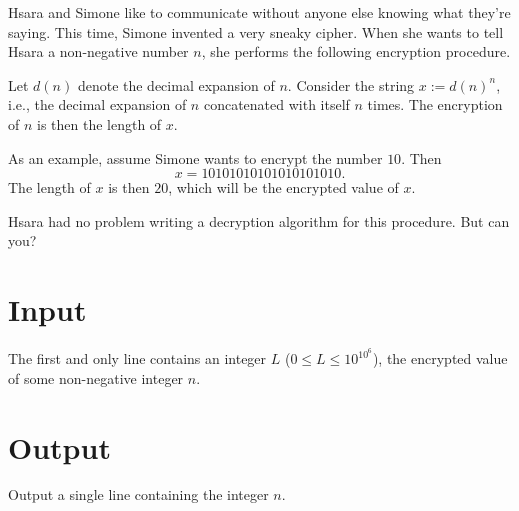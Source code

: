 
Hsara and Simone like to communicate without anyone else knowing what they're saying.
This time, Simone invented a very sneaky cipher.
When she wants to tell Hsara a non-negative number $n$, she performs the following encryption procedure.

Let $d(n)$ denote the decimal expansion of $n$.
Consider the string $x := d(n)^n$, i.e., the decimal expansion of $n$ concatenated with itself $n$ times.
The encryption of $n$ is then the length of $x$.

As an example, assume Simone wants to encrypt the number $10$.
Then
\[
        x = 10101010101010101010.
\]
The length of $x$ is then $20$, which will be the encrypted value of $x$.

Hsara had no problem writing a decryption algorithm for this procedure.
But can you?

\section*{Input}
The first and only line contains an integer $L$ ($0 \leq L \leq 10^{{10}^6}$), the encrypted value of some non-negative integer $n$.

\section*{Output}
Output a single line containing the integer $n$.

